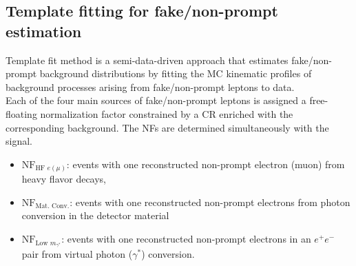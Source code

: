 \documentclass[../thesis.tex]{subfiles}
\begin{document}
\subsection{Template fitting for fake/non-prompt estimation}
\label{sec:template}
Template fit method is a semi-data-driven approach that estimates fake/non-prompt background distributions by fitting the MC kinematic profiles of background processes arising from fake/non-prompt leptons to data.\\
Each of the four main sources of fake/non-prompt leptons is assigned a free-floating normalization factor constrained by a CR enriched with the corresponding background. The NFs are determined simultaneously with the signal.
\begin{itemize}
\item $\mathrm{NF}_{\text{HF }e(\mu)}$: events with one reconstructed non-prompt electron (muon) from heavy flavor decays,
\item $\mathrm{NF}_{\text{Mat. Conv.}}$: events with one reconstructed non-prompt electrons from photon conversion in the detector material
\item $\mathrm{NF}_{\text{Low }m_{\gamma^{*}}}$: events with one reconstructed non-prompt electrons in an $e^+e^-$ pair from virtual photon ($\gamma^*$) conversion.
\end{itemize}
\end{document}
